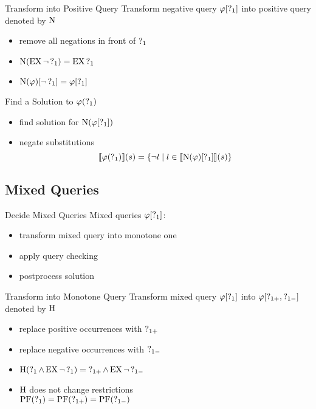 \begin{frame}{Transform into Positive Query}
  Transform negative query $\varphi[\operatorname{?}_1]$ into positive query denoted by $\operatorname{N}$
  \begin{itemize}
    \item remove all negations in front of $\operatorname{?}_{1}$
    \item $\operatorname{N}(\operatorname{EX} \lnot \operatorname{?}_1) = \operatorname{EX} \operatorname{?}_{1}$
    \item $\operatorname{N}(\varphi)[\lnot\operatorname{?}_1] = \varphi[\operatorname{?}_1]$
  \end{itemize}
\end{frame}

\begin{frame}{Find a Solution to $\varphi(\operatorname{?}_1)$}
  \begin{itemize}
    \item find solution for $\operatorname{N}(\varphi[\operatorname{?}_1])$
    \item negate substitutions \\
      \[
        \llbracket \varphi(\operatorname{?}_1) \rrbracket (s) = \{ \lnot l \mid l \in 
          \llbracket \operatorname{N}(\varphi)[\operatorname{?}_1] \rrbracket (s) \}
      \]
  \end{itemize}
\end{frame}



\subsection{Mixed Queries}%

\begin{frame}{Decide Mixed Queries}
  Mixed queries $\varphi[\operatorname{?}_1]$:
  \begin{itemize}
    \item transform mixed query into monotone one
    \item apply query checking
    \item postprocess solution
  \end{itemize}
\end{frame}

\begin{frame}{Transform into Monotone Query}
  Transform mixed query $\varphi[\operatorname{?}_1]$ into $\varphi[\operatorname{?}_{1+},\operatorname{?}_{1-}]$ denoted by $\operatorname{H}$
  \begin{itemize}
    \item replace positive occurrences with $\operatorname{?}_{1+}$
    \item replace negative occurrences with $\operatorname{?}_{1-}$
    \item $\operatorname{H}(\operatorname{?}_1 \land \operatorname{EX} \lnot \operatorname{?}_1) = \operatorname{?}_{1+} \land \operatorname{EX} \lnot \operatorname{?}_{1-}$
    \item $\operatorname{H}$ does not change restrictions \\ 
          $\operatorname{PF}(\operatorname{?}_{1}) = \operatorname{PF}(\operatorname{?}_{1+}) = \operatorname{PF}(\operatorname{?}_{1-})$
  \end{itemize}
\end{frame}

